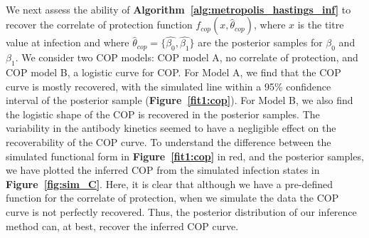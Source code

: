 \paragraph{}We next assess the ability of \textbf{Algorithm~\ref{alg:metropolis_hastings_inf}} to recover the correlate of protection function $f_{cop}(x, \hat{\theta}_{cop})$, where $x$ is the titre value at infection and where $\hat{\theta}_{cop} = \{\hat{\beta_0}, \hat{\beta_1}\}$ are the posterior samples for $\beta_0$ and $\beta_1$. We consider two COP models: COP model A, no correlate of protection, and COP model B, a logistic curve for COP. For Model A, we find that the COP curve is mostly recovered, with the simulated line within a 95\% confidence interval of the posterior sample (\textbf{Figure~\ref{fit1:cop}}). For Model B, we also find the logistic shape of the COP is recovered in the posterior samples. The variability in the antibody kinetics seemed to have a negligible effect on the recoverability of the COP curve. To understand the difference between the simulated functional form in \textbf{Figure~\ref{fit1:cop}} in red, and the posterior samples, we have plotted the inferred COP from the simulated infection states in \textbf{Figure~\ref{fig:sim_C}}. Here, it is clear that although we have a pre-defined function for the correlate of protection, when we simulate the data the COP curve is not perfectly recovered. Thus, the posterior distribution of our inference method can, at best, recover the inferred COP curve.

